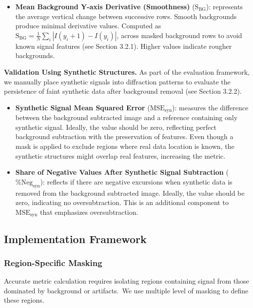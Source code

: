 \documentclass[iucr,review]{iucrjournals}
\begin{document}
\begin{itemize}
        \item \textbf{Mean Background Y-axis Derivative (Smoothness)} ($\mathrm{S}_{\mathrm{BG}}$):
        represents the average vertical change between successive rows.
        Smooth backgrounds produce minimal derivative values.
        Computed as $\mathrm{S}_{\mathrm{BG}} = \frac{1}{N} \sum_i | I(y_i + 1) - I(y_i)|$,
        across masked background rows to avoid known  signal features (see Section 3.2.1).
        Higher values indicate rougher backgrounds.
\end{itemize}



\textbf{Validation Using Synthetic Structures.} As part of the evaluation framework, we manually place synthetic signals into diffraction patterns to evaluate
the persistence of faint synthetic data after background removal (see Section 3.2.2). 

\begin{itemize}
        \item \textbf{Synthetic Signal Mean Squared Error} ($\mathrm{MSE}_{\mathrm{syn}}$):
        measures the
        difference between the background subtracted image
        and a reference containing only synthetic signal.
        Ideally, the value should be zero, reflecting perfect background subtraction with the preservation of features.
        Even though a mask is applied to exclude regions where real data location is known, the synthetic structures might overlap real features, increasing the metric.

        \item \textbf{Share of Negative Values After Synthetic Signal Subtraction} ($\%\mathrm{Neg}_{\mathrm{syn}}$):
        reflects if there are negative excursions when synthetic data is removed from the background subtracted image. 
        Ideally, the value should be zero, indicating no oversubtraction. 
        This is an additional component to $\mathrm{MSE}_{\mathrm{syn}}$ that
        emphasizes oversubtraction. 
\end{itemize}

\subsection{Implementation Framework}
\subsubsection{Region-Specific Masking}
Accurate metric calculation requires isolating regions containing signal from those dominated by background or artifacts.\
We use multiple level of masking to define these regions.
\end{document}

